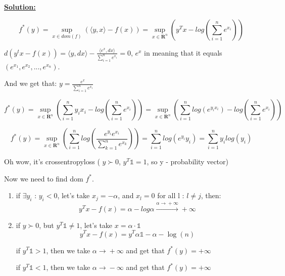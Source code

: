 \underline{\textbf{Solution:}}

\begin{equation*}
    f^*(y) = \sup_{x \in dom(f)} \left( 
    \langle y, x \rangle - f(x) \right) = \sup_{x \in \mathbf{R}^n} \left( y^Tx - log \left( \sum\limits_{i=1}^n e^{x_i}\right)
    \right)
\end{equation*}

$d(y^tx - f(x)) = \langle y, dx \rangle - \frac{\langle e^x, dx \rangle}{\sum\limits_{i=1}^n e^{x_i}}=0$,  $e^x$ in meaning that it equals $(e^{x_1}, e^{x_2}, ..., e^{x_n})$.

And we get that: $y = \frac{e^x}{\sum\limits_{i=1}^n e^{x_i}}$

\begin{equation*}
    f^*(y) = \sup_{x \in \mathbf{R}^n} \left(\sum\limits_{i=1}^n y_ix_i - log \left( \sum\limits_{i=1}^n e^{x_i}\right) \right) = \sup_{x \in \mathbf{R}^n} \left(\sum\limits_{i=1}^n log(e^{y_ix_i}) - log \left( \sum\limits_{i=1}^n e^{x_i}\right) \right) 
\end{equation*}

\begin{equation*}
    f^*(y) = \sup_{x \in \mathbf{R}^n} \left( \sum\limits_{i=1}^n log \left( \frac{e^{y_i}e^{x_i}}{\sum\limits_{k=1}^n e^{x_k}} \right) \right) = \sum\limits_{i=1}^n log \left( e^{y_i}y_i \right) = \sum\limits_{i=1}^n y_i log(y_i) 
\end{equation*}

Oh wow, it's crossentropyloss ( $y \succ 0$, $y^T\mathds{1} = 1$, so y - probability vector)

Now we need to find dom $f^*$. 
\begin{enumerate}
    \item if $\exists y_i$ : $y_i < 0$, let's take $x_j = -\alpha$, and $x_l = 0$ for all l : $l \not = j$, then:
    \begin{equation*}
    y^Tx - f(x) = \alpha - log \alpha \xrightarrow{\alpha \xrightarrow{} +\infty} +\infty    
    \end{equation*}

    \item if $y \succ 0$, but $y^T \mathds{1} \not = 1$, let's take $x = \alpha \cdot \mathds{1}$
    \begin{equation*}
    y^Tx - f(x) = y^T\alpha\mathds{1} - \alpha  - \log(n)
    \end{equation*}
    
    if $y^T \mathds{1} > 1$, then we take $\alpha \xrightarrow{} +\infty$ and get that $f^*(y) = +\infty$

    if $y^T\mathds{1} < 1$, then we take $\alpha \xrightarrow{} -\infty$ and get that $f^*(y) = +\infty$
\end{enumerate}

